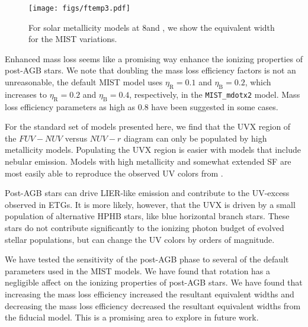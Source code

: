 \begin{figure}
  \begin{center}
    \texttt{[image: figs/ftemp3.pdf]}
    \caption{For solar metallicity models at 8\Gyr and , we show the \ha equivalent width for the MIST variations.}
    \label{fig:EWvar}
  \end{center}
\end{figure}
Enhanced mass loss seems like a promising way enhance the ionizing properties of post-AGB stars. We note that doubling the mass loss efficiency factors is not an unreasonable, the default MIST model uses $\eta_{\mathrm{R}} = 0.1$ and $\eta_{\mathrm{B}} = 0.2$, which increases to $\eta_{\mathrm{R}} = 0.2$ and $\eta_{\mathrm{B}} = 0.4$, respectively, in the {\tt MIST\_mdotx2} model. Mass loss efficiency parameters as high as 0.8 have been suggested in some cases. %


\item For the standard set of models presented here, we find that the UVX region of the $FUV-NUV$ versus $NUV-r$ diagram can only be populated by high metallicity models. Populating the UVX region is easier with models that include nebular emission. Models with high metallicity and somewhat extended SF are most easily able to reproduce the observed UV colors from \citet{Hernandez+2014}.

\item Post-AGB stars can drive LIER-like emission and contribute to the UV-excess observed in ETGs. It is more likely, however, that the UVX is driven by a small population of alternative HPHB stars, like blue horizontal branch stars. These stars do not contribute significantly to the ionizing photon budget of evolved stellar populations, but can change the UV colors by orders of magnitude.

\item We have tested the sensitivity of the post-AGB phase to several of the default parameters used in the MIST models. We have found that rotation has a negligible affect on the ionizing properties of post-AGB stars. We have found that increasing the mass loss efficiency increased the resultant \ha equivalent widths and decreasing the mass loss efficiency decreased the resultant \ha equivalent widths from the fiducial model. This is a promising area to explore in future work. 